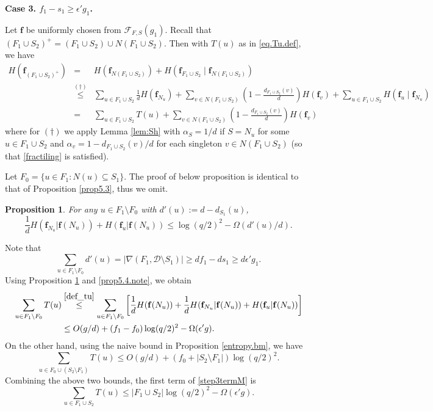 \documentclass{amsart}
\newtheorem{prop}[thm]{Proposition}
\theoremstyle{definition}
\newcommand{\gO}{\Omega}
\newcommand{\cD}{\mathcal{D} }
\newcommand{\cF}{\mathcal{F} }
\newcommand{\bbf}{\mathbf{f}}
\newcommand{\beq}[1]{\begin{equation}\label{#1}}
\newcommand{\enq}[0]{\end{equation}}
\newcommand{\eps}{\epsilon}
\newcommand{\sub}[0]{\subseteq}
\newcommand{\0}[0]{\emptyset}
\begin{document}
\noindent\textbf{Case 3. $f_1-s_1 \ge \eps' g_1$.}

Let $\bbf$ be uniformly chosen from $\cF_{F, S}(g_1)$.
Recall that $(F_1\cup S_2)^+=(F_1\cup S_2) \cup N(F_1 \cup S_2)$.
 Then with $T(u)$ as in \eqref{eq.Tu.def}, we have
\begin{eqnarray}
H(\bbf_{(F_1\cup S_2)^+})&=&H(\bbf_{N(F_1 \cup S_2)})+H(\bbf_{F_1 \cup S_2}\mid\bbf_{N(F_1 \cup S_2)})\nonumber\\
&\stackrel{(\dagger)}{\le}& \sum_{u \in F_1 \cup S_2} \frac{1}{d}H(\bbf_{N_u})+\sum_{v \in N(F_1 \cup S_2)}\left(1-\frac{d_{F_1 \cup S_2}(v)}{d}\right)H(\bbf_v) + \sum_{u \in F_1 \cup S_2}H(\bbf_{u}\mid \bbf_{N_u})\nonumber\\
&=&\sum_{u \in F_1 \cup S_2} T(u)+\sum_{v \in N(F_1 \cup S_2)}\left(1-\frac{d_{F_1 \cup S_2}(v)}{d}\right)H(\bbf_v)\label{step3termM}
\end{eqnarray}
where for $(\dagger)$ we apply Lemma \ref{lem:Sh} with $\alpha_S=1/d$ if $S=N_u$ for some $u \in F_1\cup S_2$ and $\alpha_v=1- d_{F_1\cup S_2}(v)/d$ for each singleton $v \in N(F_1 \cup S_2)$ (so that \eqref{fractiling} is satisfied). 

Let $F_0=\{u \in F_1: N(u) \sub S_1\}$. The proof of below proposition is identical to that of Proposition \ref{prop5.3}, thus we omit.
\begin{prop}\label{Prop5.4} For any $u \in F_1 \setminus F_0$ with $d'(u):=d-d_{S_1}(u)$,
\[\frac1d H(\bbf_{N_u}|\bbf(N_u))+H(\bbf_u|\bbf({N_u}))\le\log(q/2)^2-\gO(d'(u)/d).\]
\end{prop}

Note that
\beq{prop5.4.note}\sum_{u \in F_1 \setminus F_0} d'(u) =|\nabla(F_1,\cD \setminus S_1)|\ge df_1-ds_1\ge d\eps' g_1.\enq
Using Proposition \ref{Prop5.4} and \eqref{prop5.4.note}, we obtain
\[
\begin{split}
\sum_{u \in F_1 \setminus F_0}T(u)&\stackrel{\eqref{def_tu}}{\le}\sum_{u \in F_1 \setminus F_0}\left[\frac{1}{d}H(\bbf(N_u))+\frac{1}{d}H(\bbf_{N_u}|\bbf(N_u))+H(\bbf_u|\bbf(N_u))\right]\\
&\leq O(g/d) + (f_1 - f_0)\log(q/2)^2-\gO(\eps' g).
\end{split}
\]
On the other hand, using the naive bound in Proposition \ref{entropy.bm}, we have
\[
\sum_{u \in F_0 \cup (S_2 \setminus F_1)} T(u)\le O(g/d) +(f_0+|S_2 \setminus F_1|)\log(q/2)^2.
\]
Combining the above two bounds, the first term of \eqref{step3termM} is 
\beq{step3.term1}
\sum_{u \in F_1\cup S_2} T(u) \leq |F_1\cup S_2|\log(q/2)^2-\gO(\eps' g).
\enq
\end{document}
